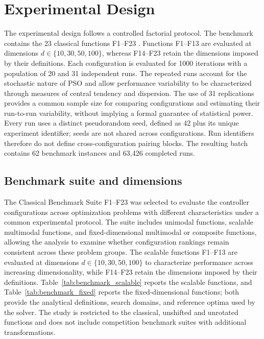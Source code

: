 \section{Experimental Design}
\label{sec:experimental_design}

The experimental design follows a controlled factorial protocol. The benchmark contains the 23 classical functions F1--F23 \cite{Yao1999,Abualigah2021}. Functions F1--F13 are evaluated at dimensions $d\in\{10,30,50,100\}$, whereas F14--F23 retain the dimensions imposed by their definitions. Each configuration is evaluated for 1000 iterations with a population of 20 and 31 independent runs. The repeated runs account for the stochastic nature of PSO and allow performance variability to be characterized through measures of central tendency and dispersion. The use of 31 replications provides a common sample size for comparing configurations and estimating their run-to-run variability, without implying a formal guarantee of statistical power. Every run uses a distinct pseudorandom seed, defined as 42 plus its unique experiment identifier; seeds are not shared across configurations. Run identifiers therefore do not define cross-configuration pairing blocks. The resulting batch contains 62 benchmark instances and 63{,}426 completed runs.


\subsection{Benchmark suite and dimensions}
\label{subsec:benchmarks}

The Classical Benchmark Suite F1--F23 was selected to evaluate the controller configurations across optimization problems with different characteristics under a common experimental protocol. The suite includes unimodal functions, scalable multimodal functions, and fixed-dimensional multimodal or composite functions, allowing the analysis to examine whether configuration rankings remain consistent across these problem groups. The scalable functions F1--F13 are evaluated at dimensions $d\in\{10,30,50,100\}$ to characterize performance across increasing dimensionality, while F14--F23 retain the dimensions imposed by their definitions. Table~\ref{tab:benchmark_scalable} reports the scalable functions, and Table~\ref{tab:benchmark_fixed} reports the fixed-dimensional functions; both provide the analytical definitions, search domains, and reference optima used by the solver. The study is restricted to the classical, unshifted and unrotated functions and does not include competition benchmark suites with additional transformations.


